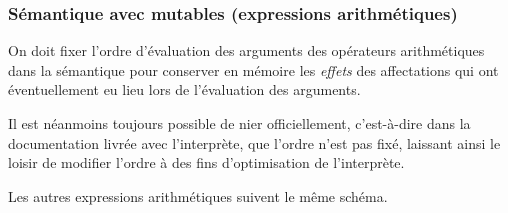 %
\begin{frame}
\frametitle{Sémantique avec mutables (expressions arithmétiques)}

On doit fixer l'ordre d'évaluation des arguments des opérateurs
arithmétiques dans la sémantique pour conserver en mémoire les
\emph{effets} des affectations qui ont éventuellement eu lieu lors de
l'évaluation des arguments.
Il est néanmoins toujours possible de nier officiellement,
c'est-à-dire dans la documentation livrée avec l'interprète, que
l'ordre n'est pas fixé, laissant ainsi le loisir de modifier l'ordre à
des fins d'optimisation de l'interprète.

\bigskip

Les autres expressions arithmétiques suivent le même schéma.

\end{frame}

